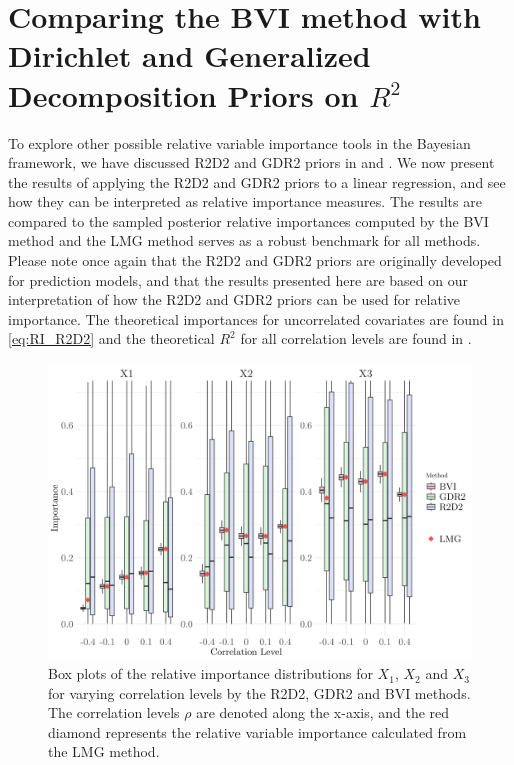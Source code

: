 \section{Comparing the BVI method with Dirichlet and Generalized Decomposition Priors on \texorpdfstring{$R^2$}{Lg}}
To explore other possible relative variable importance tools in the Bayesian framework, we have discussed R2D2 and GDR2 priors in  and . We now present the results of applying the R2D2 and GDR2 priors to a linear regression, and see how they can be interpreted as relative importance measures. The results are compared to the sampled posterior relative importances computed by the BVI method and the LMG method serves as a robust benchmark for all methods. Please note once again that the R2D2 and GDR2 priors are originally developed for prediction models, and that the results presented here are based on our interpretation of how the R2D2 and GDR2 priors can be used for relative importance. The theoretical importances for uncorrelated covariates are found in \eqref{eq:RI_R2D2} and the theoretical $R^2$ for all correlation levels are found in . 
\begin{figure}[H]%
  \centering
  \includegraphics[width=1\linewidth]{Figures/R2D2_BVI_Comparison/R2D2_BVI_boxplot.png}
  \caption[Comparison of the relative importance from the BVI method and the shrinkage prior methods]{Box plots of the relative importance distributions for $X_1$, $X_2$ and $X_3$ for varying correlation levels by the R2D2, GDR2 and BVI methods. The correlation levels $\rho$ are denoted along the x-axis, and the red diamond represents the relative variable importance calculated from the LMG method.}
  \label{fig:r2d2_importance}
\end{figure}
